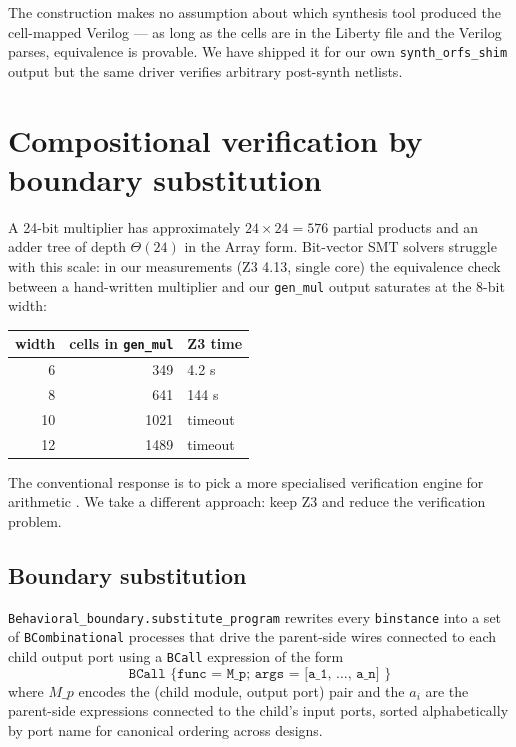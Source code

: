 \documentclass[11pt,a4paper]{article}
\begin{document}
The construction makes no assumption about which synthesis tool
produced the cell-mapped Verilog --- as long as the cells are in
the Liberty file and the Verilog parses, equivalence is provable.
We have shipped it for our own \texttt{synth\_orfs\_shim} output
but the same driver verifies arbitrary post-synth netlists.

\section{Compositional verification by boundary substitution}
\label{sec:boundary}

A 24-bit multiplier has approximately $24 \times 24 = 576$ partial
products and an adder tree of depth $\Theta(24)$ in the Array
form.  Bit-vector SMT solvers struggle with this scale: in our
measurements (Z3 4.13, single core) the equivalence check between
a hand-written multiplier and our \texttt{gen\_mul} output
saturates at the 8-bit width:

\begin{center}
\begin{tabular}{r r l}
\toprule
width & cells in \texttt{gen\_mul} & Z3 time \\
\midrule
6  & 349  & 4.2 s     \\
8  & 641  & 144 s     \\
10 & 1021 & timeout   \\
12 & 1489 & timeout   \\
\bottomrule
\end{tabular}
\end{center}

The conventional response is to pick a more specialised
verification engine for arithmetic
\cite{ciesielski2017verifying}.  We take a different approach:
keep Z3 and reduce the verification problem.

\subsection{Boundary substitution}

\texttt{Behavioral\_boundary.substitute\_program} rewrites every
\texttt{binstance} into a set of \texttt{BCombinational} processes
that drive the parent-side wires connected to each child output
port using a \texttt{BCall} expression of the form
\[
  \texttt{BCall \{ func = M\_p; args = [a_1, \ldots, a_n] \}}
\]
where $M\_p$ encodes the (child module, output port) pair and the
$a_i$ are the parent-side expressions connected to the child's
input ports, sorted alphabetically by port name for canonical
ordering across designs.
\end{document}
